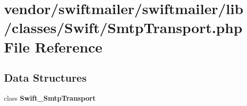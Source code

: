 \section{vendor/swiftmailer/swiftmailer/lib/classes/\+Swift/\+Smtp\+Transport.php File Reference}
\label{_smtp_transport_8php}
\subsection*{Data Structures}
\begin{DoxyCompactItemize}
\item 
class {\bf Swift\+\_\+\+Smtp\+Transport}
\end{DoxyCompactItemize}
